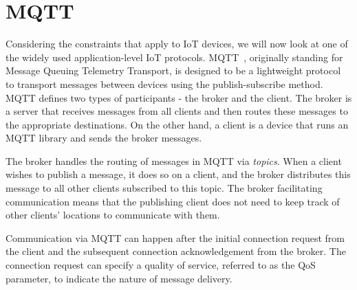 \section{MQTT}

Considering the constraints that apply to IoT devices, we will now look at one of the widely used application-level IoT protocols.
MQTT~\citep{oasis_mqtt_2014}, originally standing for Message Queuing Telemetry Transport, is designed to be a lightweight protocol to transport messages between devices using the publish-subscribe method.
MQTT defines two types of participants - the broker and the client.
The broker is a server that receives messages from all clients and then routes these messages to the appropriate destinations.
On the other hand, a client is a device that runs an MQTT library and sends the broker messages.

The broker handles the routing of messages in MQTT via \textit{topics}.
When a client wishes to publish a message, it does so on a client, and the broker distributes this message to all other clients subscribed to this topic.
The broker facilitating communication means that the publishing client does not need to keep track of other clients' locations to communicate with them.

Communication via MQTT can happen after the initial connection request from the client and the subsequent connection acknowledgement from the broker.
The connection request can specify a quality of service, referred to as the QoS parameter, to indicate the nature of message delivery.

